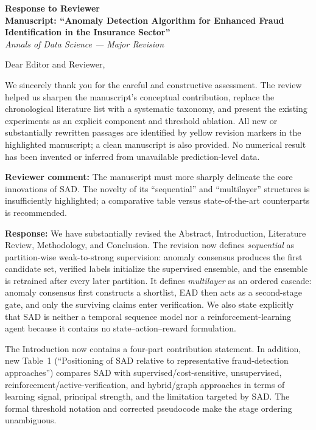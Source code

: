 \documentclass[11pt]{article}
\newcommand{\reviewercomment}[1]{%
  \vspace{4pt}\noindent\colorbox{revisionyellow}{%
  \parbox{\dimexpr\linewidth-2\fboxsep}{\textbf{Reviewer comment:} #1}}}
\newcommand{\response}{\noindent\textbf{Response:} }
\begin{document}
\begin{center}
{\Large\bfseries Response to Reviewer}\\[6pt]
{\bfseries Manuscript: ``Anomaly Detection Algorithm for Enhanced Fraud
Identification in the Insurance Sector''}\\[2pt]
{\itshape Annals of Data Science --- Major Revision}
\end{center}

Dear Editor and Reviewer,

We sincerely thank you for the careful and constructive assessment. The
review helped us sharpen the manuscript's conceptual contribution, replace the
chronological literature list with a systematic taxonomy, and present the
existing experiments as an explicit component and threshold ablation. All
new or substantially rewritten passages are identified by yellow revision
markers in the highlighted manuscript; a clean manuscript is also provided.
No numerical result has been invented or inferred from unavailable
prediction-level data.

\reviewercomment{The manuscript must more sharply delineate the core
innovations of SAD. The novelty of its ``sequential'' and ``multilayer''
structures is insufficiently highlighted; a comparative table versus
state-of-the-art counterparts is recommended.}

\response We have substantially revised the Abstract, Introduction, Literature
Review, Methodology, and Conclusion. The revision now defines
\emph{sequential} as partition-wise weak-to-strong supervision: anomaly
consensus produces the first candidate set, verified labels initialize the
supervised ensemble, and the ensemble is retrained after every later
partition. It defines \emph{multilayer} as an ordered cascade: anomaly
consensus first constructs a shortlist, EAD then acts as a second-stage gate,
and only the surviving claims enter verification. We also state explicitly
that SAD is neither a temporal sequence model nor a reinforcement-learning
agent because it contains no state--action--reward formulation.

The Introduction now contains a four-part contribution statement. In addition,
new Table~1 (``Positioning of SAD relative to representative fraud-detection
approaches'') compares SAD with supervised/cost-sensitive, unsupervised,
reinforcement/active-verification, and hybrid/graph approaches in terms of
learning signal, principal strength, and the limitation targeted by SAD. The
formal threshold notation and corrected pseudocode make the stage ordering
unambiguous.
\end{document}
